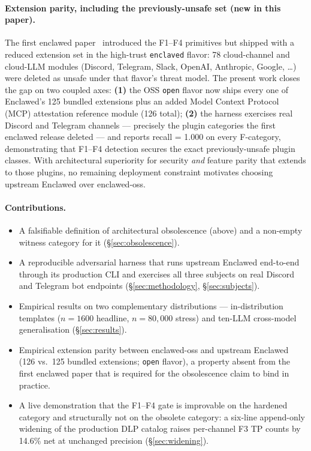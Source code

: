 \documentclass[11pt]{article}
\begin{document}
\paragraph{Extension parity, including the previously-unsafe set
(new in this paper).}
The first enclawed paper~\cite{Metere2026enclawed} introduced the
F1--F4 primitives but shipped with a reduced extension set in the
high-trust \texttt{enclaved} flavor: 78 cloud-channel and cloud-LLM
modules (Discord, Telegram, Slack, OpenAI, Anthropic, Google,
\ldots) were deleted as unsafe under that flavor's threat model.
The present work closes the gap on two coupled axes: \textbf{(1)}
the OSS \texttt{open} flavor now ships every one of Enclawed's 125
bundled extensions plus an added Model Context Protocol (MCP)
attestation reference module
(126 total); \textbf{(2)} the harness exercises real Discord and
Telegram channels --- precisely the plugin categories the first
enclawed release deleted --- and reports recall = 1.000 on every
F-category, demonstrating that F1--F4 detection secures the exact
previously-unsafe plugin classes. With architectural superiority for
security \emph{and} feature parity that extends to those plugins,
no remaining deployment constraint motivates choosing upstream
Enclawed over enclawed-oss.

\paragraph{Contributions.}
\begin{itemize}
  \item A falsifiable definition of architectural obsolescence
    (above) and a non-empty witness category for it
    (§\ref{sec:obsolescence}).
  \item A reproducible adversarial harness that runs upstream
    Enclawed end-to-end through its production CLI and exercises
    all three subjects on real Discord and Telegram bot endpoints
    (§\ref{sec:methodology}, §\ref{sec:subjects}).
  \item Empirical results on two complementary distributions ---
    in-distribution templates ($n=1600$ headline, $n=80{,}000$
    stress) and ten-LLM cross-model generalisation
    (§\ref{sec:results}).
  \item Empirical extension parity between enclawed-oss and upstream
    Enclawed (126 vs.\ 125 bundled extensions; \texttt{open} flavor),
    a property absent from the first enclawed paper that is required
    for the obsolescence claim to bind in practice.
  \item A live demonstration that the F1--F4 gate is improvable on
    the hardened category and structurally not on the obsolete
    category: a six-line append-only widening of the production DLP
    catalog raises per-channel F3 TP counts by 14.6\% net at
    unchanged precision (§\ref{sec:widening}).
\end{itemize}
\end{document}
